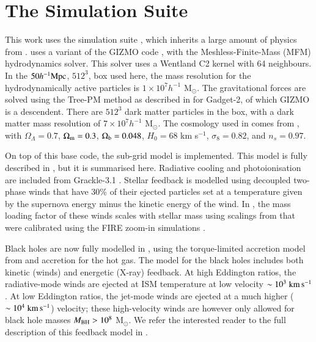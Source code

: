 \section{The \simba{} Simulation Suite}
\label{sec:simba}

This work uses the \simba{} simulation suite \citep{dave2018}, which inherits a
large amount of physics from \mufasa{} \citep{dave2016}. \simba{} uses a
variant of the GIZMO code \citep{hopkins2015}, with the Meshless-Finite-Mass
(MFM) hydrodynamics solver. This solver uses a Wentland C2 kernel with 64
neighbours. In the $50 h^{-1}{\rm Mpc}{}$, $512^3$, box used here, the mass resolution for the
hydrodynamically active particles is $1\times10^7h^{-1}$ M$_\odot$. The
gravitational forces are solved using the Tree-PM method as described in
\citet{Springel2005} for Gadget-2, of which GIZMO is a descendent. There are
$512^3$ dark matter particles in the box, with a dark matter mass resolution of
$7\times10^7h^{-1}$ M$_\odot$. The cosmology used in \simba{} comes from
\citet{PlanckCollaboration2016}, with $\Omega_\Lambda = 0.7$, $\Omega_{\rm m} =
0.3$, $\Omega_{\rm b} = 0.048$, $H_0 = 68$ km s$^{-1}$, $\sigma_8=0.82$, and
$n_s=0.97$.

On top of this base code, the \simba{} sub-grid model is implemented. This
model is fully described in \citet{dave2018}, but it is summarised here.
Radiative cooling and photoionisation are included from Grackle-3.1
\citep{smith2016}. Stellar feedback is modelled using decoupled two-phase winds
that have 30\% of their ejected particles set at a temperature given by the
supernova energy minus the kinetic energy of the wind. In \simba{}, the mass
loading factor of these winds scales with stellar mass using scalings from
\citet{muratov2015} that were calibrated using the FIRE zoom-in simulations
\citep{fireproject2014}.

Black holes are now fully modelled in \simba{}, using the torque-limited
accretion model from \citet{anglesalcazar2017} and \citet{bondi1952} accretion
for the hot gas. The model for the black holes includes both kinetic (winds)
and energetic (X-ray) feedback. At high Eddington ratios, the radiative-mode
winds are ejected at ISM temperature at low velocity $\sim 10^3 \;{\rm km}\,{\rm s}^{-1}{}$.
At low Eddington ratios, the jet-mode winds are ejected at a much higher ($\sim
10^4\;{\rm km}\,{\rm s}^{-1}{}$) velocity; these high-velocity winds are however only allowed
for black hole masses $M_{\rm BH} > 10^8$ M$_\odot$. We refer the interested
reader to the full description of this feedback model in \citet{dave2018}.

